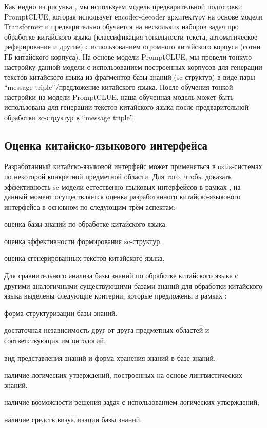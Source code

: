 Как видно из рисунка \textit{}, мы используем модель предварительной подготовки PromptCLUE, которая использует еncoder-decoder архитектуру на основе модели Transformer и предварительно обучается на нескольких наборов задач про обработке китайского языка (классификация тональности текста, автоматическое реферирование и другие) с использованием огромного китайского корпуса (сотни ГБ китайского корпуса).  На основе модели PromptCLUE, мы провели тонкую настройку данной модели с использованием построенных корпусов для генерации текстов китайского языка из фрагментов базы знаний (sc-структур) в виде пары ``message triple''/предложение китайского языка. После обучения тонкой настройки на модели PromptCLUE, наша обученная модель может быть использована для генерации текстов китайского языка после предварительной обработки sc-структур в ``message triple''. 

\subsection{Оценка китайско-языкового интерфейса}
Разработанный китайско-языковой интерфейс может применяться в ostis-системах по некоторой конкретной предметной области. Для того, чтобы доказать эффективность sc-модели естественно-языковых интерфейсов в рамках , на данный момент осуществляется оценка разработанного китайско-языкового интерфейса в основном по следующим трём аспектам:
\begin{textitemize}
	\item оценка базы знаний по обработке китайского языка.
	\item оценка эффективности формирования sc-структур.
	\item оценка сгенерированных текстов китайского языка.
\end{textitemize}

Для сравнительного анализа базы знаний по обработке китайского языка с другими аналогичными существующими базами знаний для обработки китайского языка выделены следующие критерии, которые предложены в рамках :
\begin{textitemize}
	\item форма структуризации базы знаний.
	\item достаточная независимость друг от друга предметных областей и соответствующих им онтологий.
	\item вид представления знаний и форма хранения знаний в базе знаний.
	\item наличие логических утверждений, построенных на основе лингвистических знаний.
	\item наличие возможности решения задач с использованием логических утверждений;
	\item наличие средств визуализации базы знаний.
\end{textitemize}

